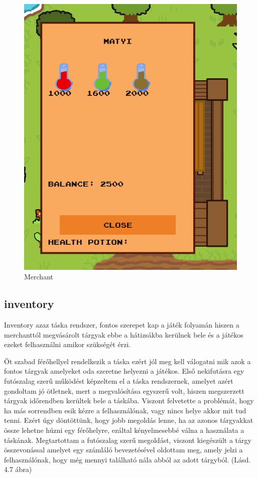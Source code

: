 \begin{figure}[H]
    \centering
    \includegraphics[width=9.0truecm]{images/merchant.png}
    \caption{Merchant}
    \label{fig:Merchant}
\end{figure}


\subsection{inventory}

Inventory azaz táska rendszer, fontos szerepet kap a játék folyamán hiszen a merchanttól megvásárolt tárgyak ebbe a hátizsákba kerülnek bele és a játékos ezeket felhasználni amikor szükségét érzi.

Öt szabad férőhellyel rendelkezik a táska ezért jól meg kell válogatni mik azok a fontos tárgyak amelyeket oda szeretne helyezni a játékos. Első nekifutásra egy futószalag szerű működést képzeltem el a táska rendszernek, amelyet azért gondoltam jó ötletnek, mert a megvalósítása egyszerű volt, hiszen megszerzett tárgyak időrendben kerültek bele a táskába. Viszont felvetette a problémát, hogy ha más sorrendben esik kézre a felhasználónak, vagy nincs helye akkor mit tud tenni. Ezért úgy döntöttünk, hogy jobb megoldás lenne, ha az azonos tárgyakkat össze lehetne húzni egy férőhelyre, ezáltal kényelmesebbé válna a használata a táskának. Megtartottam a futószalag szerű megoldást, viszont kiegészült a tárgy összevonással amelyet egy számláló bevezetésével oldottam meg, amely jelzi a felhasználónak, hogy még mennyi található nála abból az adott tárgyból. (Lásd. 4.7 ábra)

